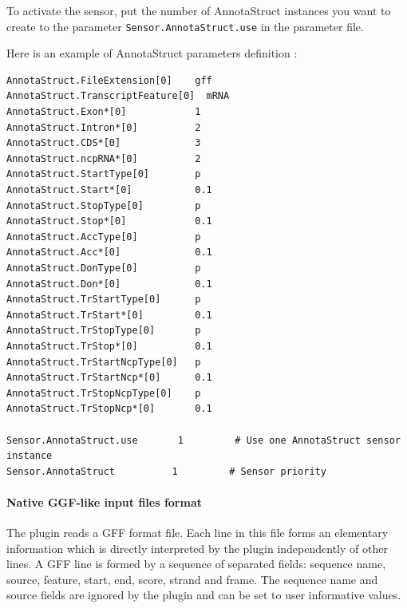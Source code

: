 To activate the sensor, put the number of AnnotaStruct instances you want to create to the parameter
\texttt{Sensor.AnnotaStruct.use} in the parameter file.

Here is an example of AnnotaStruct parameters definition :
\begin{Verbatim}[fontsize=\small]
AnnotaStruct.FileExtension[0]    gff
AnnotaStruct.TranscriptFeature[0]  mRNA
AnnotaStruct.Exon*[0]            1
AnnotaStruct.Intron*[0]          2
AnnotaStruct.CDS*[0]             3
AnnotaStruct.ncpRNA*[0]          2
AnnotaStruct.StartType[0]        p 
AnnotaStruct.Start*[0]           0.1
AnnotaStruct.StopType[0]         p 
AnnotaStruct.Stop*[0]            0.1
AnnotaStruct.AccType[0]          p 
AnnotaStruct.Acc*[0]             0.1
AnnotaStruct.DonType[0]          p 
AnnotaStruct.Don*[0]             0.1
AnnotaStruct.TrStartType[0]      p 
AnnotaStruct.TrStart*[0]         0.1
AnnotaStruct.TrStopType[0]       p 
AnnotaStruct.TrStop*[0]          0.1
AnnotaStruct.TrStartNcpType[0]   p
AnnotaStruct.TrStartNcp*[0]      0.1
AnnotaStruct.TrStopNcpType[0]    p
AnnotaStruct.TrStopNcp*[0]       0.1

Sensor.AnnotaStruct.use       1         # Use one AnnotaStruct sensor instance
Sensor.AnnotaStruct          1         # Sensor priority
\end{Verbatim}

\paragraph{Native GGF-like input files format}

The plugin reads a GFF format file. Each line in this file forms an
elementary information which is directly interpreted by the plugin
independently of other lines. A GFF line is formed by a sequence of
separated fields: sequence name, source, feature, start, end, score,
strand and frame. The sequence name and source fields are ignored by
the plugin and can be set to user informative values.

